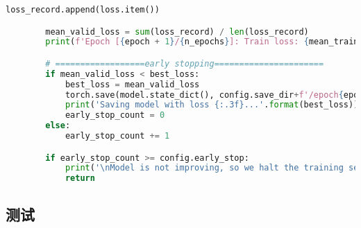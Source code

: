 \documentclass[lang=cn,a4paper]{elegantpaper}
\begin{document}
\begin{lstlisting}[language = python]
            loss_record.append(loss.item())

        mean_valid_loss = sum(loss_record) / len(loss_record)
        print(f'Epoch [{epoch + 1}/{n_epochs}]: Train loss: {mean_train_loss:.4f}, Valid loss: {mean_valid_loss:.4f}')

        # ==================early stopping======================
        if mean_valid_loss < best_loss:
            best_loss = mean_valid_loss
            torch.save(model.state_dict(), config.save_dir+f'/epoch{epoch}.pt')  # Save your best model
            print('Saving model with loss {:.3f}...'.format(best_loss))
            early_stop_count = 0
        else:
            early_stop_count += 1

        if early_stop_count >= config.early_stop:
            print('\nModel is not improving, so we halt the training session.')
            return
\end{lstlisting}

\subsection{测试}
\end{document}
